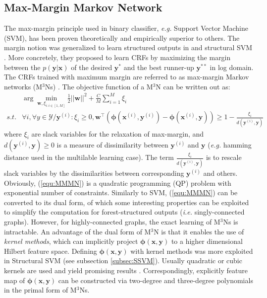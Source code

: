 \subsection{Max-Margin Markov Network}
\label{subsec:MMMN}
The max-margin principle used in binary classifier, \emph{e.g.} Support Vector Machine (SVM), has been proven theoretically and empirically \citep{Vapnik} superior to others.        
The margin notion was generalized to learn structured outputs in \citep{Taskar03} and structural SVM \citep{StructSVM}. More concretely, they proposed to learn CRFs by maximizing the margin 
between the $p(\mathbf{y|x})$ of the desired $\mathbf{y^*}$ and the best runner-up $\mathbf{y}^{**}$ in log domain. The CRFs trained with maximum margin are referred to as 
max-margin Markov networks (M$^3$Ns) \citep{Taskar03}.  The objective function of a M$^3$N can be written out as: 
\begin{equation}
    \begin{array}{rl}
        & \arg\min_{\mathbf{w},\xi_{i:i\in[1,M]}}  \frac{1}{2} ||\mathbf{w}||^2 +\frac{C}{M} \sum_{i=1}^M \xi_i \\
   s.t. &\forall i, \forall y\in\mathcal{Y}/\mathbf{y}^{(i)}: \xi_i\geq0, \mathbf{w}^\top (\boldsymbol{\phi}(\mathbf{x}^{(i)},\mathbf{y}^{(i)})-\boldsymbol{\phi} 
        (\mathbf{x}^{(i)},\mathbf{y}))\geq 1-\frac{\xi_i}{d(\mathbf{y}^{(i)},\mathbf{y})}
    \end{array}
    \label{equ:MMMN}
\end{equation}
where $\xi_i$ are slack variables for the relaxation of 
max-margin, and $d(\mathbf{y}^{(i)},\mathbf{y})\geq0$ is a measure of dissimilarity between $\mathbf{y}^{(i)}$ and $\mathbf{y}$ 
(\emph{e.g.} hamming distance used in the multilable learning case). The term $\frac{\xi_i}{d(\mathbf{y}^{(i)},\mathbf{y})}$ is to rescale 
slack variables by the dissimilarities between corresponding $\mathbf{y}^{(i)}$ and others. 
Obviously, (\ref{equ:MMMN}) is a quadratic programming (QP)  problem with exponential number of 
constraints. Similarly to SVM, (\ref{equ:MMMN}) can be converted to its dual form, of which some interesting properties can be exploited 
to simplify the computation 
for forest-structured outputs (\emph{i.e.} singly-connected graphs). However, for highly-connected graphs, the exact learning of M$^3$Ns is intractable.  
An advantage of the dual form of M$^3$N is that it enables the use of \emph{kernel methods}, which can implicitly project 
$\boldsymbol{\phi}(\mathbf{x},\mathbf{y})$ to 
a higher dimensional Hilbert feature space. Defining $\boldsymbol{\phi}(\mathbf{x},\mathbf{y})$  with kernel methods was more exploited in Structural SVM \citep{StructSVM} (see subsection \ref{subsec:SSVM}). 
Usually quadratic or cubic kernels are used and yield promising results \citep{Taskar03}. 
Correspondingly, 
explicitly feature map of $\boldsymbol{\phi}(\mathbf{x},\mathbf{y})$  can be constructed via two-degree and three-degree polynomials in the primal form of M$^3$Ns.  

